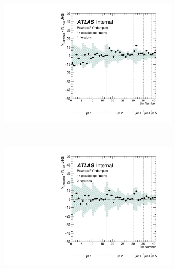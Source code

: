 \clearpage


\begin{figure}
\begin{subfigure}[]{0.5\textwidth}
\includegraphics[width=\textwidth]{fig/Stress/110404atlfast/Bias1Iterations.pdf}
\end{subfigure}
~
\begin{subfigure}[]{0.5\textwidth}
\includegraphics[width=\textwidth]{fig/Stress/110404atlfast/Bias2Iterations.pdf}
\end{subfigure}
\\
\begin{subfigure}[]{0.5\textwidth}

\end{subfigure}
\end{figure}
